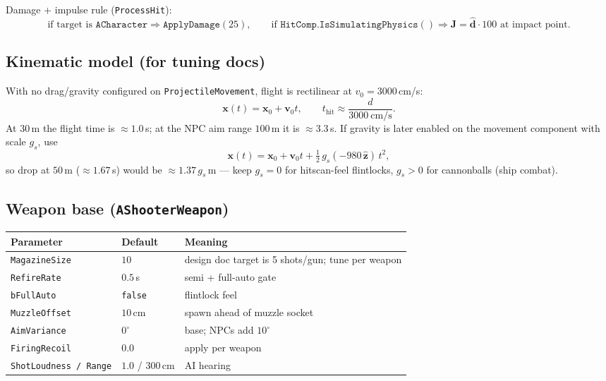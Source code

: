 \documentclass[11pt,a4paper]{article}
\begin{document}
Damage + impulse rule (\texttt{ProcessHit}):
\begin{equation}
\text{if target is } \mathtt{ACharacter} \Rightarrow \mathtt{ApplyDamage}(25), \qquad
\text{if } \mathtt{HitComp.IsSimulatingPhysics()} \Rightarrow \mathbf{J} = \hat{\mathbf{d}}\cdot 100 \text{ at impact point}.
\end{equation}

\subsection{Kinematic model (for tuning docs)}
With no drag/gravity configured on \texttt{ProjectileMovement}, flight is rectilinear at $v_0 = 3000$\,cm/s:
\begin{equation}
\mathbf{x}(t) = \mathbf{x}_0 + \mathbf{v}_0 t, \qquad t_{\text{hit}} \approx \frac{d}{3000~\text{cm/s}}.
\end{equation}
At $30$\,m the flight time is $\approx 1.0$\,s; at the NPC aim range $100$\,m it is $\approx 3.3$\,s.
If gravity is later enabled on the movement component with scale $g_s$, use
\begin{equation}
\mathbf{x}(t) = \mathbf{x}_0 + \mathbf{v}_0 t + \tfrac{1}{2}\, g_s(-980\,\hat{\mathbf{z}})\,t^2,
\end{equation}
so drop at $50$\,m ($\approx 1.67$\,s) would be $\approx 1.37\,g_s$\,m --- keep $g_s = 0$ for hitscan-feel flintlocks, $g_s > 0$ for cannonballs (ship combat).

\subsection{Weapon base (\texttt{AShooterWeapon})}
\begin{center}
\begin{tabular}{@{}lll@{}}
\toprule
Parameter & Default & Meaning \\
\midrule
\texttt{MagazineSize} & $10$ & design doc target is 5 shots/gun; tune per weapon \\
\texttt{RefireRate} & $0.5$\,s & semi + full-auto gate \\
\texttt{bFullAuto} & \texttt{false} & flintlock feel \\
\texttt{MuzzleOffset} & $10$\,cm & spawn ahead of muzzle socket \\
\texttt{AimVariance} & $0^\circ$ & base; NPCs add $10^\circ$ \\
\texttt{FiringRecoil} & $0.0$ & apply per weapon \\
\texttt{ShotLoudness / Range} & $1.0$ / $300$\,cm & AI hearing \\
\bottomrule
\end{tabular}
\end{center}
\end{document}
